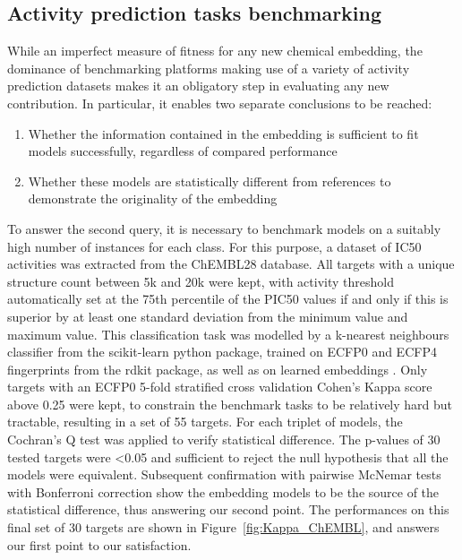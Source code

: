 \documentclass[doublespacing]{bmcart}
\begin{document}
\subsection*{Activity prediction tasks benchmarking}
While an imperfect measure of fitness for any new chemical embedding, the dominance of benchmarking platforms making use of a variety of activity prediction datasets makes it an obligatory step in evaluating any new contribution. In particular, it enables two separate conclusions to be reached:
\begin{enumerate}
\item Whether the information contained in the embedding is sufficient to fit models successfully, regardless of compared performance
\item Whether these models are statistically different from references to demonstrate the originality of the embedding
\end{enumerate}

To answer the second query, it is necessary to benchmark models on a suitably high number of instances for each class. For this purpose, a dataset of IC50 activities was extracted from the ChEMBL28 database. All targets with a unique structure count between 5k and 20k were kept, with activity threshold automatically set at the 75th percentile of the PIC50 values if and only if this is superior by at least one standard deviation from the minimum value and maximum value. This classification task was modelled by a k-nearest neighbours classifier from the scikit-learn python package\cite{scikit-learn}, trained on ECFP0 and ECFP4 fingerprints from the rdkit package\cite{LandrumRDKit}, as well as on learned embeddings . Only targets with an ECFP0 5-fold stratified cross validation Cohen's Kappa score above 0.25 were kept, to constrain the benchmark tasks to be relatively hard but tractable, resulting in a set of 55 targets. For each triplet of models, the Cochran's Q test was applied to verify statistical difference. The p-values of 30 tested targets were <0.05 and sufficient to reject the null hypothesis that all the models were equivalent. Subsequent confirmation with pairwise McNemar tests with Bonferroni correction show the embedding models to be the source of the statistical difference, thus answering our second point. The performances on this final set of 30 targets are shown in Figure~\ref{fig:Kappa_ChEMBL}, and answers our first point to our satisfaction.
\end{document}
